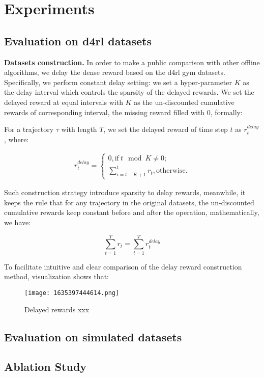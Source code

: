 \section{Experiments}

\subsection{Evaluation on d4rl datasets}

\textbf{Datasets construction.} In order to make a public comparison with other offline algorithms, we delay the dense reward based on the d4rl gym datasets. Specifically, we perform constant delay setting: we set a hyper-parameter $K$ as the delay interval which controls the sparsity of the delayed rewards. We set the delayed reward at equal intervals with $K$ as the un-discounted cumulative rewards of corresponding interval, the missing reward filled with 0, formally:

For a trajectory $\tau$ with length $T$, we set the delayed reward of time step $t$ as $r_t^{delay}$, where:

$$
\begin{aligned}
r_t^{delay} = \begin{cases}
0, \text{if} \ t \mod K \neq 0; \\
\sum_{i = t - K + 1}^t r_t, \text{otherwise}.
\end{cases}
\end{aligned}
$$

Such construction strategy introduce sparsity to delay rewards, meanwhile, it keeps the rule that for any trajectory in the original datasets, the un-discounted cumulative rewards keep constant before and after the operation, mathematically, we have:

$$
\sum_{t = 1}^{T} r_t = \sum_{t = 1}^{T} r_t^{delay}
$$

To facilitate intuitive and clear comparison of the delay reward construction method, visualization shows that:
\begin{figure}
    \centering
    \texttt{[image: 1635397444614.png]}
    \caption{Delayed rewards xxx}
    \label{fig:my_label}
\end{figure}

\subsection{Evaluation on simulated datasets}


\subsection{Ablation Study}



